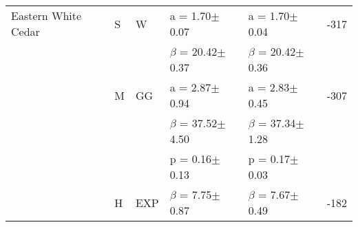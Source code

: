 \documentclass{article}
\begin{document}
\begin{table}
{\begin{tabular}{lllllr}
Eastern White Cedar & S & W & a = 1.70$\pm$0.07 & a = 1.70$\pm$0.04 & -317 \\
 &  &  & $\beta$ = 20.42$\pm$0.37 & $\beta$ = 20.42$\pm$0.36 &  \\
 & M & GG & a = 2.87$\pm$0.94 & a = 2.83$\pm$0.45 & -307 \\
 &  &  & $\beta$ = 37.52$\pm$4.50 & $\beta$ = 37.34$\pm$1.28 &  \\
 &  &  & p = 0.16$\pm$0.13 & p = 0.17$\pm$0.03 &  \\
 & H & EXP & $\beta$ = 7.75$\pm$0.87 & $\beta$ = 7.67$\pm$0.49 & -182 \\
\bottomrule
\end{tabular}
}%
\end{table}
\end{document}
